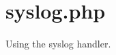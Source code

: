 \hypertarget{syslog_8php-example}{
\section{syslog.php}
}
Using the syslog handler.


\begin{DoxyCodeInclude}
\end{DoxyCodeInclude}
 